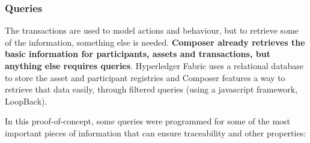 \subsubsection*{Queries}
The transactions are used to model actions and behaviour, but to retrieve some of the information, something else is needed. \textbf{Composer already retrieves the basic information for participants, assets and transactions, but anything else requires queries}. Hyperledger Fabric uses a relational database to store the asset and participant registries and Composer features a way to retrieve that data easily, through filtered queries (using a javascript framework, LoopBack).

In this proof-of-concept, some queries were programmed for some of the most important pieces of information that can ensure traceability and other properties:


